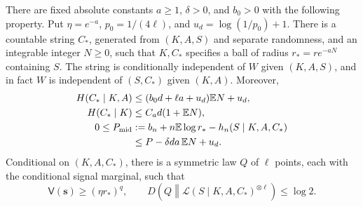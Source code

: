 \begin{lemma}
\label{l:sep:localization}
There are fixed absolute constants \(a\ge1\), \(\delta>0\), and
\(b_0>0\) with the following property.  Put
\(\eta=e^{-a}\), \(p_0=1/(4\ell)\), and
\(u_d=\log(1/p_0)+1\).  There is a countable string \(C_*\), generated
from \((K,A,S)\) and separate randomness, and an integrable integer
\(N\ge0\), such that \(K,C_*\) specifies a ball of radius
\(r_*=re^{-aN}\) containing \(S\).  The string is conditionally
independent of \(W\) given \((K,A,S)\), and in fact
\(W\) is independent of \((S,C_*)\) given \((K,A)\).  Moreover,
\begin{align}
 H(C_*\mid K,A)&\le(b_0d+\ell a+u_d)\mathbb E N+u_d,
 \label{l:sep:conditional-code}\\
 H(C_*\mid K)&\le C_a d(1+\mathbb E N),
 \label{l:sep:ambient-code}\\
 0\le P_{\mathrm{mid}}
 &:=b_n+n\mathbb E\log r_*-h_n(S\mid K,A,C_*) \notag\\
 &\le P-\delta da\,\mathbb E N+u_d.
 \label{l:sep:refinement-payment}
\end{align}
Conditional on \((K,A,C_*)\), there is a symmetric law \(Q\) of
\(\ell\) points, each with the conditional signal marginal, such that
\begin{equation}
 \mathsf V(\mathbf s)\ge(\eta r_*)^q,\qquad
 D\!\left(Q\middle\|
       \mathcal L(S\mid K,A,C_*)^{\otimes\ell}\right)\le\log2.
 \label{l:sep:passing-tuple}
\end{equation}
\end{lemma}
